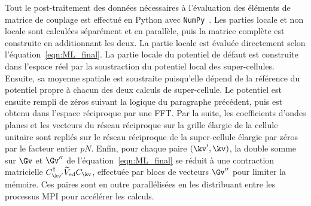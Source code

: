
Tout le post-traitement des données nécessaires à l'évaluation des éléments de matrice de couplage est effectué en Python avec \texttt{NumPy}~\cite{ArrayProgrammingNumPy}. Les parties locale et non locale sont calculées séparément et en parallèle, puis la matrice complète est construite en additionnant les deux. La partie locale est évaluée directement selon l'équation~\eqref{eqn:ML_final}. La partie locale du potentiel de défaut est construite dans l'espace réel par la soustraction du potentiel local des super-cellules. Ensuite, sa moyenne spatiale est soustraite puisqu'elle dépend de la référence du potentiel propre à chacun des deux calculs de super-cellule. Le potentiel est ensuite rempli de zéros suivant la logique du paragraphe précédent, puis est obtenu dans l'espace réciproque par une FFT. Par la suite, les coefficients d'ondes planes et les vecteurs du réseau réciproque sur la grille élargie de la cellule unitaire sont repliés sur le réseau réciproque de la super-cellule élargie par zéros par le facteur entier $pN$. Enfin, pour chaque paire $(\kv',\kv)$, la double somme sur $\Gv$ et $\Gv''$ de l'équation~\eqref{eqn:ML_final} se réduit à une contraction matricielle $C^\dag_{\kv'}\widetilde{V}_\text{ed}C_\kv$, effectuée par blocs de vecteurs $\Gv''$ pour limiter la mémoire. Ces paires sont en outre parallélisées en les distribuant entre les processus MPI pour accélérer les calculs.


